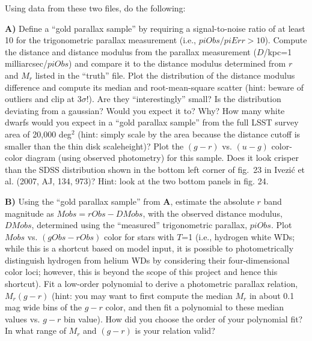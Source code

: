 Using data from these two files, do the following:

{\bf A)} Define a ``gold parallax sample'' by requiring a signal-to-noise ratio of at least 10 for the 
trigonometric parallax measurement (i.e., $piObs/piErr>10$). Compute the distance and distance 
modulus from the parallax measurement ($D$/kpc=1 milliarcsec/$piObs$) and compare it to the 
distance modulus determined from $r$ and $M_r$ listed in the ``truth'' file. Plot the distribution of 
the distance modulus difference and compute its median and root-mean-square scatter (hint: beware 
of outliers and clip at 3$\sigma$!). Are they ``interestingly'' small? Is the distribution deviating from 
a gaussian? Would you expect it to? Why? How many white dwarfs would you expect in a ``gold parallax 
sample'' from the full LSST survey area of 20,000 deg$^2$ (hint: simply scale by the area because the 
distance cutoff is smaller than the thin disk scaleheight)? Plot the $(g-r)$ vs. $(u-g)$ color-color 
diagram (using observed photometry) for this sample. Does it look crisper than the SDSS distribution 
shown in the bottom left corner of fig.~23 in Ivezi\'{c} et al. (2007, AJ, 134, 973)? Hint: look at the two 
bottom panels in fig. 24.

{\bf B)} Using the ``gold parallax sample'' from {\bf A}, estimate the absolute $r$ band magnitude as 
$Mobs = rObs-DMobs$, with the observed distance modulus, $DMobs$, determined using
the ``measured'' trigonometric parallax, $piObs$. Plot $Mobs$ vs. $(gObs-rObs)$ color for 
stars with $T$=1 (i.e., hydrogen white WDs; while this is a shortcut based on model input, it is 
possible to photometrically distinguish hydrogen from helium WDs by considering their four-dimensional 
color loci; however, this is beyond the scope of this project and hence this shortcut). Fit a low-order 
polynomial to derive a photometric parallax relation, $M_r(g-r)$ (hint: you may want to first compute 
the median $M_r$ in about 0.1 mag wide bins of the $g-r$ color, and then fit a polynomial to these 
median values vs. $g-r$ bin value). How did you choose the order of your polynomial fit? In what 
range of $M_r$ and $(g-r)$ is your relation valid?


